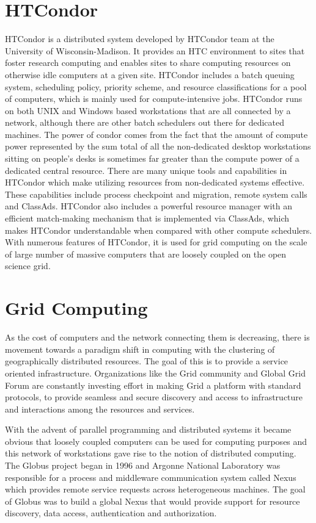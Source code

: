 \documentclass[ms,electronic,double]{nuthesis}
\begin{document}
\section{HTCondor} HTCondor is a distributed system developed by HTCondor team at the 
University of Wisconsin-Madison. It provides an HTC environment to sites 
that foster research computing and enables sites to share computing resources on otherwise  
idle computers at a given site. HTCondor includes a batch queuing 
system, scheduling policy, priority scheme, and resource classifications for a pool of 
computers, which is mainly used for compute-intensive jobs. HTCondor runs on both
 UNIX and Windows based workstations that are all connected by a network, although there are other batch schedulers out there for dedicated machines. 
The power of condor comes from  the fact that  the amount of compute power 
represented by the sum total of all the 
 non-dedicated desktop workstations sitting on people's desks is sometimes far 
 greater than the compute power of a dedicated central resource. There are many 
 unique tools and capabilities in HTCondor which make utilizing resources from 
 non-dedicated systems effective. These capabilities include process checkpoint 
 and migration, remote system calls and ClassAds. HTCondor also includes a 
 powerful resource manager with an efficient match-making mechanism that is 
 implemented via ClassAds, which makes HTCondor understandable when compared with other 
 compute schedulers\cite{manual56}. With numerous features of HTCondor, it is 
 used for grid computing on the scale of large number of massive computers 
 that are loosely coupled on the open science grid.
 
 
\section{Grid Computing}

As the cost of computers and the network connecting them is decreasing, there is movement towards a 
paradigm shift in computing with the clustering of geographically distributed 
resources. The goal of this is to provide a 
service oriented infrastructure. Organizations like the Grid community and Global Grid Forum are constantly investing effort in making Grid a platform with standard 
protocols, to provide seamless and secure discovery and access to infrastructure and interactions among
 the resources and services.
 
 With the advent of parallel programming and distributed systems it became 
 obvious that loosely coupled computers can be used for computing purposes and this 
 network of workstations  gave rise to the notion of distributed computing. 
 The Globus project began in 1996 and Argonne National Laboratory was responsible for a process 
 and middleware communication system called Nexus which provides remote service 
 requests across heterogeneous machines. The goal of Globus was to build a 
 global Nexus that would provide support for resource discovery, data access, 
 authentication and authorization.
\end{document}
